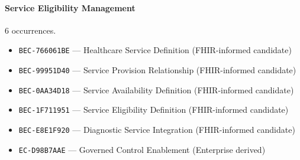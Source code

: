 \documentclass[11pt,a4paper,openany]{book}
\begin{document}
\paragraph{Service Eligibility Management} 6 occurrences.\par
\begin{itemize}
\item \texttt{BEC-766061BE} --- Healthcare Service Definition (FHIR-informed candidate)
\item \texttt{BEC-99951D40} --- Service Provision Relationship (FHIR-informed candidate)
\item \texttt{BEC-0AA34D18} --- Service Availability Definition (FHIR-informed candidate)
\item \texttt{BEC-1F711951} --- Service Eligibility Definition (FHIR-informed candidate)
\item \texttt{BEC-E8E1F920} --- Diagnostic Service Integration (FHIR-informed candidate)
\item \texttt{EC-D98B7AAE} --- Governed Control Enablement (Enterprise derived)
\end{itemize}
\end{document}
